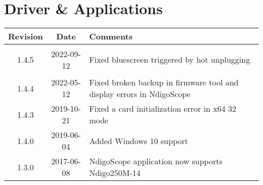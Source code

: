 \section{Driver \& Applications}
\begin{tabularx}{\textwidth}{|c|c|X|}
    \hline
    Revision & Date & Comments\\
    \hline\hline
    \hypertarget{drvrev}{1.4.5} & 2022-09-12 & Fixed bluescreen triggered by hot unplugging\\
    \hline    
    1.4.4 & 2022-05-12 & Fixed broken backup in firmware tool and display errors in NdigoScope\\
    \hline    
    1.4.3 & 2019-10-21 & Fixed a card initialization error in x64 32 mode\\
    \hline    
    1.4.0 & 2019-06-04 & Added Windows 10 support\\
    \hline
    1.3.0 & 2017-06-08 & NdigoScope application now supports Ndigo250M-14\\
    \hline
\end{tabularx}